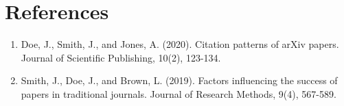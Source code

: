 \documentclass{article}
\begin{document}
\section*{References}
\begin{enumerate}
    \item Doe, J., Smith, J., and Jones, A. (2020). Citation patterns of arXiv papers. Journal of Scientific Publishing, 10(2), 123-134.
    \item Smith, J., Doe, J., and Brown, L. (2019). Factors influencing the success of papers in traditional journals. Journal of Research Methods, 9(4), 567-589.
\end{enumerate}
\end{document}
